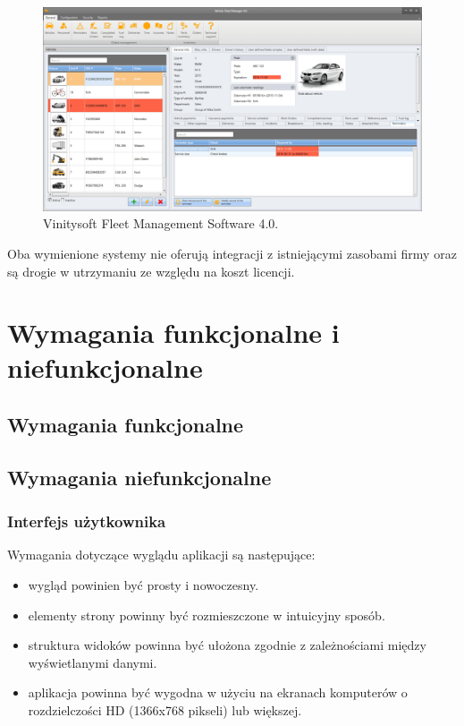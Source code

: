 \documentclass[eng,printmode,openany]{mgr}
\begin{document}
	\begin{figure}[H]
		\centering
		\includegraphics[width=\textwidth]{images/vinitysoft.png}
		\caption{Vinitysoft Fleet Management Software 4.0.}
	\end{figure}
	
	Oba wymienione systemy nie oferują integracji z istniejącymi zasobami firmy oraz są drogie w utrzymaniu ze względu na koszt licencji.
	\newpage
	\chapter{Wymagania funkcjonalne i niefunkcjonalne}
	\section{Wymagania funkcjonalne}

	
	\section{Wymagania niefunkcjonalne}
	\subsection{Interfejs użytkownika}
	Wymagania dotyczące wyglądu aplikacji są następujące:
	\begin{itemize}
		\item wygląd powinien być prosty i nowoczesny.
		\item elementy strony powinny być rozmieszczone w intuicyjny sposób.
		\item struktura widoków powinna być ułożona zgodnie z zależnościami między wyświetlanymi danymi.
		\item aplikacja powinna być wygodna w użyciu na ekranach komputerów o rozdzielczości HD (1366x768 pikseli) lub większej.
	\end{itemize}
	\newpage
\end{document}
